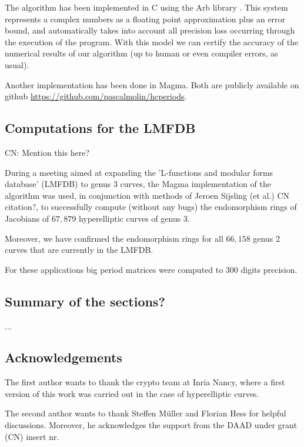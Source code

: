 \documentclass[main.tex]{subfiles}
\begin{document}
  The algorithm has been implemented in C using the Arb library \cite{Johansson2013arb}.
  This system represents a complex numbers as a floating point approximation
  plus an error bound, and automatically
  takes into account all precision loss occurring through the
  execution of the program. With this model we can certify
  the accuracy of the numerical results of our algorithm (up to human or even
  compiler errors, as usual).

  Another implementation has been done in Magma. Both are publicly available
  on github \url{https://github.com/pascalmolin/hcperiods}.

  
  \subsection{Computations for the LMFDB}
  
  \todo CN: Mention this here?
  
    During a meeting aimed at expanding the 'L-functions and modular forms database' (LMFDB) to genus $3$ curves, 
  the Magma implementation of the algorithm was used, in conjunction with methods of Jeroen Sijsling (et al.) \todo CN citation?, to successfully compute (without any bugs)
  the endomorphism rings of Jacobians of $67,879$ hyperelliptic curves of genus $3$.
  
  Moreover, we have confirmed the endomorphism rings for all $66,158$ genus 2 curves that are currently in the LMFDB.
 
  For these applications big period matrices were computed to $300$ digits precision.
  
  \subsection{Summary of the sections?}
  
  ...
  
  \subsection{Acknowledgements}

  The first author wants to thank the crypto team at Inria Nancy, where
  a first version of this work was carried out in the case of hyperelliptic
  curves.
  
  The second author wants to thank Steffen Müller and Florian Hess for helpful discussions. Moreover, he acknowledges the support from the DAAD under grant \todo (CN) insert nr.
 
\end{document}
